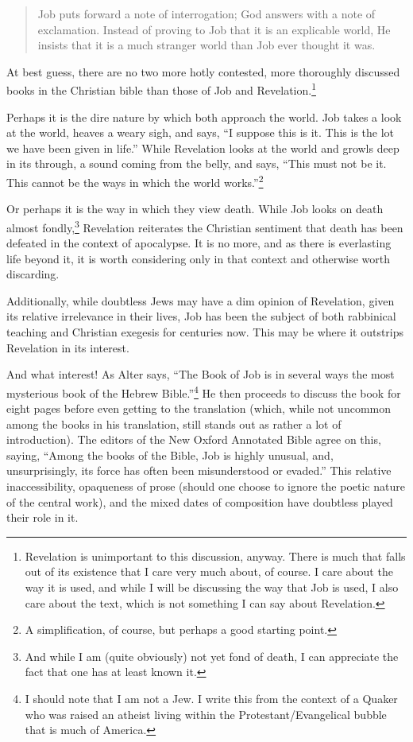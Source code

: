 \begin{quote}
Job puts forward a note of interrogation; God answers with a note of exclamation. Instead of proving to Job that it is an explicable world, He insists that it is a much stranger world than Job ever thought it was.

\parencite{intro-to-job}
\end{quote}

At best guess, there are no two more hotly contested, more thoroughly discussed books in the Christian bible than those of Job and Revelation.\footnote{Revelation is unimportant to this discussion, anyway. There is much that falls out of its existence that I care very much about, of course. I care about the way it is used, and while I will be discussing the way that Job is used, I also care about the text, which is not something I can say about Revelation.}

Perhaps it is the dire nature by which both approach the world. Job takes a look at the world, heaves a weary sigh, and says, ``I suppose this is it. This is the lot we have been given in life.'' While Revelation looks at the world and growls deep in its through, a sound coming from the belly, and says, ``This must not be it. This cannot be the ways in which the world works.''\footnote{A simplification, of course, but perhaps a good starting point.}

Or perhaps it is the way in which they view death. While Job looks on death almost fondly,\footnote{And while I am (quite obviously) not yet fond of death, I can appreciate the fact that one has at least known it.} Revelation reiterates the Christian sentiment that death has been defeated in the context of apocalypse. It is no more, and as there is everlasting life beyond it, it is worth considering only in that context and otherwise worth discarding.

Additionally, while doubtless Jews may have a dim opinion of Revelation, given its relative irrelevance in their lives, Job has been the subject of both rabbinical teaching and Christian exegesis for centuries now. This may be where it outstrips Revelation in its interest.

And what interest! As Alter says, ``The Book of Job is in several ways the most mysterious book of the Hebrew Bible.''\footnote{I should note that I am not a Jew. I write this from the context of a Quaker who was raised an atheist living within the Protestant/Evangelical bubble that is much of America.} \parencite[457]{alter} He then proceeds to discuss the book for eight pages before even getting to the translation (which, while not uncommon among the books in his translation, still stands out as rather a lot of introduction). The editors of the New Oxford Annotated Bible agree on this, saying, ``Among the books of the Bible, Job is highly unusual, and, unsurprisingly, its force has often been misunderstood or evaded.'' \parencite[735]{noab} This relative inaccessibility, opaqueness of prose (should one choose to ignore the poetic nature of the central work), and the mixed dates of composition have doubtless played their role in it.

